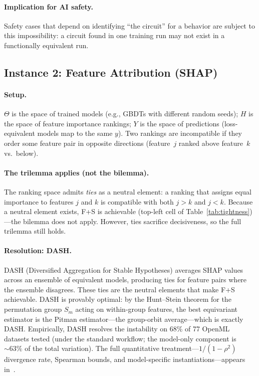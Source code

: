 \documentclass{article}
\begin{document}
\paragraph{Implication for AI safety.}
Safety cases that depend on identifying ``the circuit'' for a behavior are
subject to this impossibility: a circuit found in one training run may not
exist in a functionally equivalent run.

\subsection{Instance 2: Feature Attribution (SHAP)}
\label{sec:attribution}

\paragraph{Setup.}
$\Theta$ is the space of trained models (e.g., GBDTs with different
random seeds);
$H$ is the space of feature importance rankings;
$Y$ is the space of predictions (loss-equivalent models map to the same
$y$).
Two rankings are incompatible if they order some feature pair in opposite
directions (feature~$j$ ranked above feature~$k$ vs.\ below).

\paragraph{The trilemma applies (not the bilemma).}
The ranking space admits \emph{ties} as a neutral element: a ranking that
assigns equal importance to features $j$ and $k$ is compatible with both
$j > k$ and $j < k$.
Because a neutral element exists, F+S is achievable (top-left cell of
Table~\ref{tab:tightness})---the bilemma does not apply.
However, ties sacrifice decisiveness, so the full trilemma still holds.

\paragraph{Resolution: DASH.}
DASH (Diversified Aggregation for Stable Hypotheses) averages SHAP values across an ensemble
of equivalent models, producing ties for feature pairs where the ensemble
disagrees.
These ties are the neutral elements that make F+S achievable.
DASH is provably optimal: by the Hunt--Stein theorem for the permutation
group $S_m$ acting on within-group features, the best equivariant estimator
is the Pitman estimator---the group-orbit average---which is exactly DASH.
Empirically, DASH resolves the instability on 68\% of 77 OpenML datasets
tested (under the standard workflow; the model-only component is ${\sim}63\%$
of the total variation).
The full quantitative treatment---$1/(1{-}\rho^2)$ divergence
rate, Spearman bounds, and model-specific
instantiations---appears in~\citet{anonymous2026attribution}.
\end{document}
